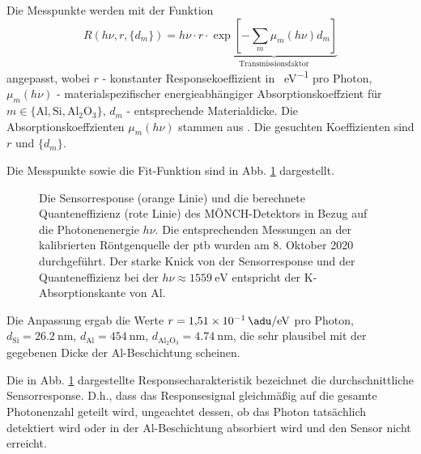 \noindent
Die Messpunkte werden mit der Funktion
\begin{equation}
    R(h\nu, r, \{d_m\}) = h\nu\cdot r\cdot\underbrace{\exp\left[-\sum_{m}\mu_m(h\nu)d_m\right]}_{\text{Transmissionsfaktor}}
\label{eq:response_durchschnitt}
\end{equation}
angepasst, wobei $r$ - konstanter Responsekoeffizient in \si{\adu\per\eV} pro Photon, $\mu_m(h\nu)$ - materialspezifischer energieabhängiger Absorptionskoeffzient für $m \in \{\text{Al}, \text{Si}, \text{Al$_2$O$_3$}\}$,  $d_m$ - entsprechende Materialdicke. Die Absorptionskoeffzienten $\mu_m(h\nu)$ stammen aus \cite{xray-coeffs}. Die gesuchten Koeffizienten sind $r$ und $\{d_m\}$.

\noindent
Die Messpunkte sowie die Fit-Funktion sind in Abb. \ref{fig:response_moench} dargestellt.
\begin{figure}[H]
    \centering
    
    \caption{Die Sensorresponse (orange Linie) und die berechnete Quanteneffizienz (rote Linie) des MÖNCH-Detektors in Bezug auf die Photonenenergie $h\nu$. Die entsprechenden Messungen an der kalibrierten Röntgenquelle der \gls{ptb} wurden am 8. Oktober 2020 durchgeführt. Der starke Knick von der Sensorresponse und der Quanteneffizienz bei der $h\nu \approx \SI{1559}{\eV}$ entspricht der K-Absorptionskante von Al.}
    \label{fig:response_moench}
\end{figure}
\noindent
Die Anpassung ergab die Werte
$r = \SI{1.51e-1}{\adu\per\eV}$ pro Photon, $d_\text{Si} = \SI{26.2}{\nano\meter}$, $d_\text{Al} = \SI{454}{\nano\meter}$,
$d_\text{Al$_2$O$_3$} = \SI{4.74}{\nano\meter}$, die sehr plausibel mit der gegebenen Dicke der Al-Beschichtung scheinen.

\noindent
Die in Abb. \ref{fig:response_moench} dargestellte Responsecharakteristik bezeichnet die durchschnittliche Sensorresponse. D.h., dass das Responsesignal gleichmäßig auf die gesamte Photonenzahl geteilt wird, ungeachtet dessen, ob das Photon tatsächlich detektiert wird oder in der Al-Beschichtung absorbiert wird und den Sensor nicht erreicht.

